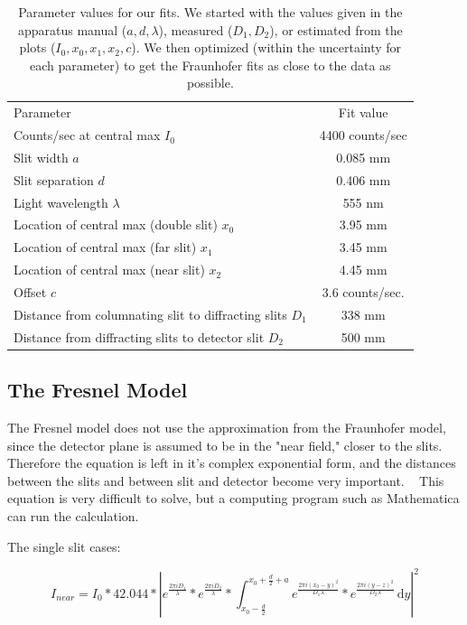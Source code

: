 \documentclass[prb,preprint]{revtex4-1}
\begin{document}
\begin{table}[h!]
\centering
\caption{Parameter values for our fits. We started with the values given in the apparatus manual ($a, d, \lambda$), measured ($D_1, D_2$), or estimated from the plots ($I_0, x_0, x_1, x_2, c$).  We then optimized (within the uncertainty for each parameter) to get the Fraunhofer fits as close to the data as possible. }
\begin{ruledtabular}
\begin{tabular}{lc}
Parameter & Fit value       \\
Counts/sec at central max $I_0$     & 4400 counts/sec \\
Slit width $a$       & 0.085 mm        \\
Slit separation $d$       & 0.406 mm        \\
Light wavelength $\lambda$ & 555 nm          \\
Location of central max (double slit) $x_0$     & 3.95 mm         \\
Location of central max (far slit) $x_1$     & 3.45 mm \\
Location of central max (near slit) $x_2$ & 4.45 mm \\
Offset $c$       & 3.6 counts/sec. \\
Distance from columnating slit to diffracting slits $D_1$     & 338 mm          \\
Distance from diffracting slits to detector slit $D_2$     & 500 mm         
\end{tabular}
\end{ruledtabular}
\label{parameters}
\end{table}

\subsection{The Fresnel Model}

The Fresnel model does not use the approximation from the Fraunhofer model, since the detector plane is assumed to be in the "near field," closer to the slits. Therefore the equation is left in it's complex exponential form, and the distances between the slits and between slit and detector become very important.  ~\cite{wolfram} This equation is very difficult to solve, but a computing program such as Mathematica can run the calculation.  

The single slit cases:

\begin{equation}
I_{near}=I_{0}*42.044*|e^{\frac{2 \pi i D_{1}}{\lambda}}*e^{\frac{2 \pi i D_{2}}{\lambda}}*\int_{x_{0}-\frac{d}{2}}^{x_{0}+\frac{d}{2}+a} \! e^{\frac{2 \pi i (x_{0}-y)^{2}}{D_{1} \lambda}}*e^{\frac{2 \pi i (y-z)^{2}}{D_{2} \lambda}} \, \mathrm{d}y |^{2}
\end{equation}
\end{document}
